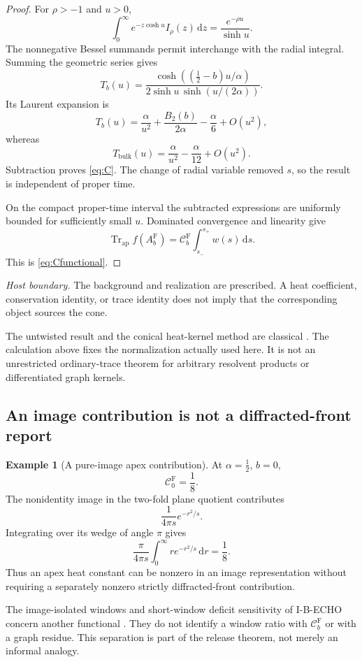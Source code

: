 \documentclass[11pt,a4paper]{article}
\newcommand{\dd}{\mathrm d}
\newcommand{\Fr}{\mathrm F}
\newcommand{\ApTr}{\operatorname{Tr}_{\mathrm{ap}}}
\newcommand{\Ccal}{\mathcal C}
\theoremstyle{plain}
\theoremstyle{definition}
\newtheorem{example}[theorem]{Example}
\theoremstyle{remark}
\numberwithin{equation}{section}
\newcommand{\nonsource}{%
  \par\smallskip\noindent
  \emph{Host boundary.}
  The background and realization are prescribed.
  A heat coefficient, conservation identity, or trace identity does
  not imply that the corresponding object sources the cone.%
}
\begin{document}
\begin{proof}
For \(\rho>-1\) and \(u>0\),
\[
 \int_0^\infty e^{-z\cosh u}I_\rho(z)\,\dd z
 =\frac{e^{-\rho u}}{\sinh u}.
\]
The nonnegative Bessel summands permit interchange with the
radial integral. Summing the geometric series gives
\begin{equation}
 T_b(u)=
 \frac{\cosh((\tfrac12-b)u/\alpha)}
      {2\sinh u\,\sinh(u/(2\alpha))}.
 \label{eq:Tclosed}
\end{equation}
Its Laurent expansion is
\[
 T_b(u)=\frac{\alpha}{u^2}
       +\frac{B_2(b)}{2\alpha}-\frac{\alpha}{6}
       +O(u^2),
\]
whereas
\[
 T_{\mathrm{bulk}}(u)
 =\frac{\alpha}{u^2}-\frac{\alpha}{12}+O(u^2).
\]
Subtraction proves \eqref{eq:C}. The change of radial variable
removed \(s\), so the result is independent of proper time.

On the compact proper-time interval the subtracted expressions
are uniformly bounded for sufficiently small \(u\). Dominated
convergence and linearity give
\[
 \ApTr f(A_b^\Fr)
 =\Ccal_b^\Fr\int_{s_-}^{s_+}w(s)\,\dd s.
\]
This is \eqref{eq:Cfunctional}.
\end{proof}
\nonsource

The untwisted result and the conical heat-kernel method are
classical \cite{Fursaev1994,FursaevMiele,Vassilevich}.
The calculation above fixes the normalization actually used here.
It is not an unrestricted ordinary-trace theorem for arbitrary
resolvent products or differentiated graph kernels.

\subsection{An image contribution is not a diffracted-front report}

\begin{example}[A pure-image apex contribution]
\label{ex:image}
At \(\alpha=\tfrac12\), \(b=0\),
\[
 \Ccal_0^\Fr=\frac18.
\]
The nonidentity image in the two-fold plane quotient contributes
\[
 \frac1{4\pi s}e^{-r^2/s}.
\]
Integrating over its wedge of angle \(\pi\) gives
\[
 \frac{\pi}{4\pi s}
 \int_0^\infty r e^{-r^2/s}\,\dd r=\frac18.
\]
Thus an apex heat constant can be nonzero in an image
representation without requiring a separately nonzero strictly
diffracted-front contribution.
\end{example}

The image-isolated windows and short-window deficit sensitivity
of I-B-ECHO concern another functional
\cite{CheungEcho}. They do not identify a window ratio with
\(\Ccal_b^\Fr\) or with a graph residue. This separation is part
of the release theorem, not merely an informal analogy.
\end{document}
